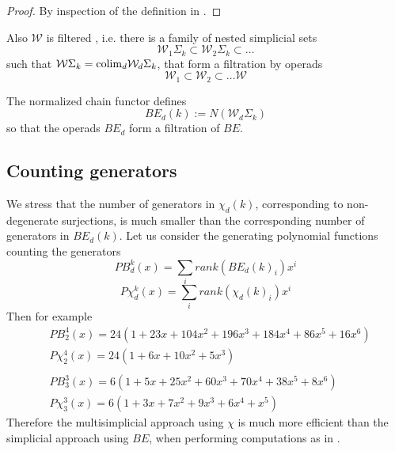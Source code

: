 \begin{proof}
By inspection of the definition in \cite{BFsmall}. %
\end{proof}

Also $\mathcal{W}$ is filtered \cite{BFsmall}, i.e.
there is a family of nested simplicial sets $$\mathcal{W}_1\Sigma_k \subset \mathcal{W}_2 \Sigma_k
 \subset \dots $$ such that 
$\mathcal{W}\Sigma_k={\rm colim}_d \mathcal{W}_d\Sigma_k$, that form a filtration by operads 
$$\mathcal{W}_1 \subset \mathcal{W}_2 \subset \dots \mathcal{W}$$


The normalized chain functor defines 
$$BE_d(k):=N(\mathcal{W}_d \Sigma_k)$$ so that the operads $BE_d$  
form a filtration of $BE$.

\subsection{Counting  generators}

We stress that the number of generators in $\chi_d(k)$, corresponding to non-degenerate surjections,
is much smaller than the corresponding number of generators in $BE_d(k)$. 
Let us consider the generating polynomial functions counting the generators
$$PB_d^k(x) = \sum_i rank(BE_d(k)_i) x^i $$ $$P\chi_d^k(x)=
\sum_i rank(\chi_d(k)_i) x^i$$   
Then for example 
\begin{align*}
& PB_2^4(x)=24(1+23x+104x^2+196x^3+184x^4+86x^5+16x^6)\\
& P\chi_2^4(x)=24(1+6x+10x^2+5x^3) \\
& \\
& PB_3^3(x) = 6(1+5x+25x^2+60x^3+70x^4+38x^5+8x^6 ) \\
&  P\chi_3^3(x)= 6(1+3x+7x^2+9x^3+6x^4+x^5)
\end{align*} 
Therefore the multisimplicial approach using $\chi$ is much more efficient than the simplicial
approach using $BE$, when performing computations as in \cite{formality}. 



